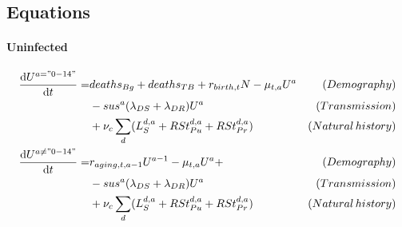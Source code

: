 \subsection{Equations}

\paragraph{Uninfected}

\begin{align*}
\frac{\mathrm{d}U^{a="0-14"}}{\mathrm{d}t} =& deaths_{Bg} + deaths_{TB} + r_{birth, t} N - \mu_{t, a} U^a & (Demography)\\
  &- sus^{a}(\lambda_{DS} + \lambda_{DR})U^a & (Transmission) \\
  &+ \nu_{c} \sum_{d} ( L_S^{d, a} + RSt_{Pu}^{d, a} + RSt_{Pr}^{d, a} ) & (Natural\,history) \\
\frac{\mathrm{d}U^{a\neq"0-14"}}{\mathrm{d}t} =& r_{aging, t, a-1} U^{a-1} - \mu_{t, a} U^a +  & (Demography)\\
  &- sus^{a}(\lambda_{DS} + \lambda_{DR})U^a & (Transmission) \\
  &+ \nu_{c} \sum_{d} ( L_S^{d, a} + RSt_{Pu}^{d, a} + RSt_{Pr}^{d, a} ) & (Natural\,history)
\end{align*}

